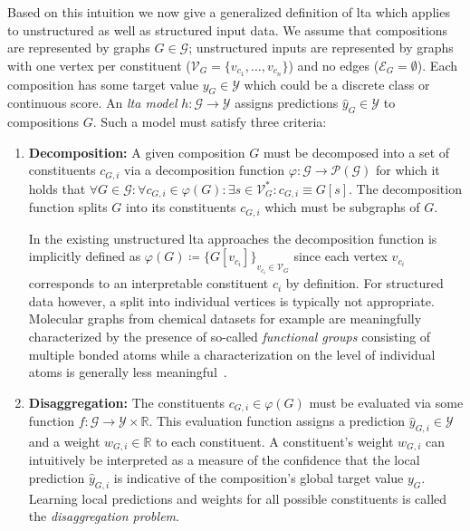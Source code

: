 Based on this intuition we now give a generalized definition of \ac{lta} which applies to unstructured as well as structured input data.
We assume that compositions are represented by graphs $G \in \mathcal{G}$;
unstructured inputs are represented by graphs with one vertex per constituent ($\mathcal{V}_G = \{ v_{c_1}, \dots, v_{c_n} \}$) and no edges ($\mathcal{E}_G = \emptyset$).
Each composition has some target value $y_G \in \mathcal{Y}$ which could be a discrete class or continuous score.
An \textit{\ac{lta} model} $h: \mathcal{G} \to \mathcal{Y}$ assigns predictions $\hat{y}_G \in \mathcal{Y}$ to compositions $G$.
Such a model must satisfy three criteria:
\begin{enumerate}[label=\textbf{\arabic*.}]
	\item \textbf{Decomposition:}
		A given composition $G$ must be decomposed into a set of constituents $c_{G,i}$ via a decomposition function $\varphi: \mathcal{G} \to \mathcal{P}(\mathcal{G})$ for which it holds that $\forall G \in \mathcal{G}: \forall c_{G,i} \in \varphi(G): \exists s \in \mathcal{V}_G^{*}: c_{G,i} \equiv G[s]$.
		The decomposition function splits $G$ into its constituents $c_{G,i}$ which must be subgraphs of $G$.

		In the existing unstructured \ac{lta} approaches the decomposition function is implicitly defined as $\varphi(G) \coloneqq {\{ G[v_{c_i}] \}}_{v_{c_i} \in \mathcal{V}_G}$ since each vertex $v_{c_i}$ corresponds to an interpretable constituent $c_i$ by definition.
		For structured data however, a split into individual vertices is typically not appropriate.
		Molecular graphs from chemical datasets for example are meaningfully characterized by the presence of so-called \textit{functional groups} consisting of multiple bonded atoms while a characterization on the level of individual atoms is generally less meaningful~\cite{McNaught1997}.
	\item \textbf{Disaggregation:}
		The constituents $c_{G, i} \in \varphi(G)$ must be evaluated via some function $f: \mathcal{G} \to \mathcal{Y} \times \mathbb{R}$.
		This evaluation function assigns a prediction $\hat{y}_{G, i} \in \mathcal{Y}$ and a weight $w_{G, i} \in \mathbb{R}$ to each constituent.
		A constituent's weight $w_{G, i}$ can intuitively be interpreted as a measure of the confidence that the local prediction $\hat{y}_{G, i}$ is indicative of the composition's global target value $y_G$.
		Learning local predictions and weights for all possible constituents is called the \textit{disaggregation problem}.


\end{enumerate}
